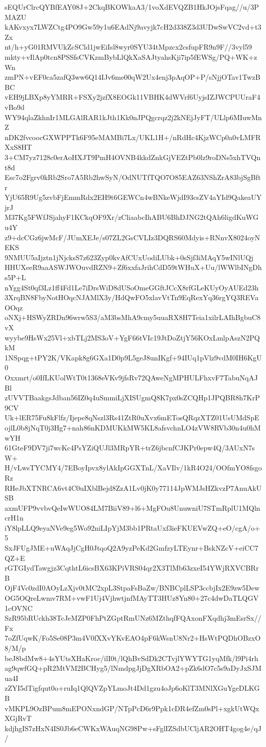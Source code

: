 sEQUrClrcQYBfEAY08J+2CkqBKOWkaA3/1voXdEVQZB1HkJOjsFqag//u/3PMAZU
kAKvxyx7LWZCtg4PO9Gw59y1u6EAdNj9avyjk7cH2d338Z3d3UDwSwVC2vd+t3Zx
nt/h+yG01RMVUkZcSCld1jwEiIsl8wyr0SYU34tMpzcx2csfupFR9n9F//3vyl59
mkty+vIlAp0tcn8PSSfsCVKzmBybLlQkXaSAJtyahsKji7ip5fEWSg/PQ+WK+zWn
zmPN+vEF0ca5zafQ3ww6Q14IJv6me00qW2Ux4enj3pAqOP+P/sNjjOTav1TwzBBC
vEH9jLBXp8yYMRR+FSXy2jzfX8EOGk11VBHK4dWVrf6UyjsIZJWCPUUraF4vBo9d
WY94qlaZkhnIr1MLGAlRAR1kJth1Kk0nJPQgcrqz2j2kNEjJyFT/ULlp6MIuwMnZ
nDK2fvcoocGXWPPTk6F95eMAMBi7Lx/UKL1H+/nRdHc4KjzWCp0a0vLMFRXxS8HT
3+CM7yz7128c0erAoHXJT9PmH4OVNB4kkdZnkGjVEZtPb0lz9roDNs5xhTVQnt8d
Esc7o2Fgrv0kRb2Sro7A5Rb2hwSyN/OdNUTfTQO7O85EAZ63NShZrA83bjSgBftr
YjU65R9Ug5zvbFjEmmRdx2EH9t6GEWCn4wBNkeWjdI93csZV4aYId9QakeaUYjrJ
M37Kg5FWfJSjahyF1KCkqOF9Xr/zCliaabcIhABU6BhDJNG2tQAh6ligdKuWGu4Y
z9+dcCGz6jwMcF/JUmXEJe/s07ZL2GsCVLIz3DQRS60Mdyis+RNnvX8024oyNEKS
9NMUU5aIjztn1jNjcksS7z623Zyp0kvAfCUxUodiLUbk+0sSjf3iMAqY5wINlUQj
HHUXeeR9aaASWJWOuvdRZN9+Zf6xxfaJrihCdD59tWHuX+Uu/lWWlbINgDhs5P+L
nYgg4St0qf3Lz1ff4Fd1Le7iDrsWiD8dUSoOmeGGftJCcX8rfGLeKUyOyAUEd23h
3XrqBN8FbyNotHOqcNJAMlX3y/HdQwFO5xlavVtTn9EqRexYq36rgYQ3REVaOOqz
oNXj+HSWyZRDn96wrw5S3/aM3bsMhA9cmy5uuaRX8H7Teia1xilrLAIhBgbuC8vX
wyybe9HsWx25Vl+xbTLj2MS3oV+YgF66tVIc19JtDoZtjY56KOxLmlpAszN2PQkM
1NSpqg+tPY2K/VKapk8g6GXa1D0p9L5geJ8unIKgf+94IUq1pVlz9vdM0IH6KgU0
Oxxmrt/o0IfLKUolWtT0t1368eVKv9jfsRv72QAweNgMPHULFhxvF7TabuNqAJBl
zUVVTBaakgsJdban56IZ0q4uSmmiLjXISUgmQ8K7px0sZCQHp1JPQBR8h7KrP9CV
Uk+lER75Fu8kFlfz/Ijepe8qNszl3Rs41ZtR0uXvx6mETosQRqzXTZ01UsUMdSpE
ojlL0b8jNqT0j3Hg7+nah86nKDMUKkMW5KL8afsvchnLO4zVW8RVb30n4u0hMwYH
61GteF9DV7ji7wcKc4PsYZiQUJl3MRpYR+trZ6jbcnfCJKPr0epw4Q/3AUxN7sW+
H/vLwsTYCMY4/7EBoyIpvx8ylAkIpGGXTnL/XaVIlv/1kR4O24/OOfmYO8fsgoRz
RHeJbXTNRCA6vt4C0uIXblBejd8ZzA1Lv0jK0y77114JpWMJsHZkvzP7AnuAkUSB
axmUFP9vvbvQeIwWUO84LM7BiiV89+l6+MgFOu8UnuwniU7STmRplU1MQlncrH1n
iY8lpLLQ9eyaNVe9eg5Wo92niLIpYjM3bb1PRtaUxf3ieFKUEVwZQ+eO/cgA/o+5
SxJFUgJME+uWAqJjCgH0JtqoQ2A9yzPeKd2GmfzyLTEynr+BskNZcV+eiCC7QZ+E
rGTGIydTawgjz3CqthtL6icsBX63KPiVRS04qr2X3TlMb63zxeI54YWjRXVCBRrB
OjF4Vc0zdI0AOyLzXjv0tMC2xpL3StpaFsBaZw/BNBCplLSP3ccbjIx2E9zw5Dew
OG5OQreLwmv7RM+vwF1Uj4VjhwtjnfMAyTT3HUz8Yn80+27c4dwDaTLQGV1cOVNC
SzR95bRUckh38TcJeMZP0FhPtZGptRmUNz6MZthqfFQAxonFXqdhj3mEsrSx//Fx
7oZfUqwK/Fo5Se08P3m4V0fXXvYKvEAO4pF6kWsnU8Nr2+HsWtPQDhOBzxO8/M/p
beJ8bdMw8+4sYUtsXHaKroc/ilI0t/lQhBvSdDk2CTvjlYWYTG1yqMfk/l9Pi4rh
ag9qwfGQ+pR2MtVM2BCHyg5/lNmdpgJjDgXRbOA2+pZk6dO7c5s9aDyJxSJMua4I
zZYI5dTigfqut0o+ruIq1QlQVZpYLmoJt4Dd1gzu4oJp6oKlT3MNlXGuYgeDLKGB
vMKPL9OzBPum8mEPONxndGP/NTpPcD6r9Ppk1cDR4efZm0sPl+xgkUtWQxXGjRvT
kdjhgIS7zHxN4IS0Jb6eCWKxWAuqNG98Pw+sFglIZSdbUCljAR2OHT4gog4e/qJ/
